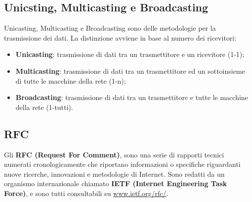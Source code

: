         \subsection{Unicsting, Multicasting e Broadcasting}
        Unicasting, Multicasting e Broadcasting sono delle metodologie per la trasmissione dei dati.
        La distinzione avviene in base al numero dei ricevitori:

        \begin{itemize}
            \item \textbf{Unicasting}: trasmissione di dati tra un trasmettitore e un ricevitore (1-1);
            \item \textbf{Multicasting}: trasmissione di dati tra un trasmettitore ed un sottoinsieme di tutte le macchine della rete (1-n);
            \item \textbf{Broadcasting}: trasmissione di dati tra un trasmettitore e tutte le macchine della rete (1-tutti).
        \end{itemize}

        \subsection{RFC}
        Gli \textbf{RFC (Request For Comment)}, sono una serie di rapporti tecnici numerati
        cronologicamente che riportano informazioni o specifiche riguardanti nuove ricerche,
        innovazioni e metodologie di Internet. Sono redatti da un organismo internazionale chiamato
        \textbf{IETF (Internet Engineering Task Force)}, e sono tutti consultabili su \url{www.ietf.org/rfc/}.
